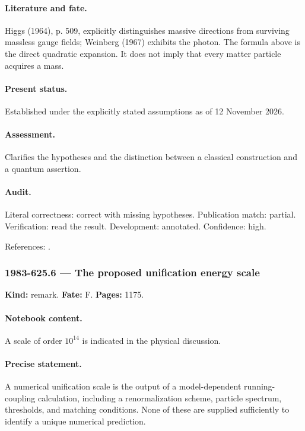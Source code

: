\paragraph{Literature and fate.} Higgs (1964), p. 509, explicitly distinguishes massive directions from surviving massless gauge fields; Weinberg (1967) exhibits the photon. The formula above is the direct quadratic expansion. It does not imply that every matter particle acquires a mass.

\paragraph{Present status.} Established under the explicitly stated assumptions as of 12 November 2026.

\paragraph{Assessment.} Clarifies the hypotheses and the distinction between a classical construction and a quantum assertion.

\paragraph{Audit.} Literal correctness: correct with missing hypotheses. Publication match: partial. Verification: read the result. Development: annotated. Confidence: high.

\noindent References: \citep{higgs1964broken,weinberg1967leptons}.\par

\subsubsection{1983-625.6 --- The proposed unification energy scale}

\label{item:1983-625.6}

\noindent\textbf{Kind:} remark. \textbf{Fate:} F. \textbf{Pages:} 1175.\par

\paragraph{Notebook content.} A scale of order \(10^{14}\) is indicated in the physical discussion.

\paragraph{Precise statement.} A numerical unification scale is the output of a model-dependent running-coupling calculation, including a renormalization scheme, particle spectrum, thresholds, and matching conditions. None of these are supplied sufficiently to identify a unique numerical prediction.

